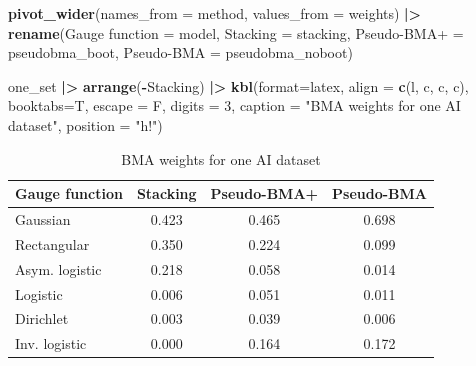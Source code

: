 \documentclass[
]{article}
\newenvironment{Shaded}{\begin{snugshade}}{\end{snugshade}}
\newcommand{\AttributeTok}[1]{\textcolor[rgb]{0.13,0.29,0.53}{#1}}
\newcommand{\DecValTok}[1]{\textcolor[rgb]{0.00,0.00,0.81}{#1}}
\newcommand{\FunctionTok}[1]{\textcolor[rgb]{0.13,0.29,0.53}{\textbf{#1}}}
\newcommand{\NormalTok}[1]{#1}
\newcommand{\OtherTok}[1]{\textcolor[rgb]{0.56,0.35,0.01}{#1}}
\newcommand{\SpecialCharTok}[1]{\textcolor[rgb]{0.81,0.36,0.00}{\textbf{#1}}}
\newcommand{\StringTok}[1]{\textcolor[rgb]{0.31,0.60,0.02}{#1}}
\begin{document}
\begin{Shaded}
\begin{Highlighting}[]
  \FunctionTok{pivot\_wider}\NormalTok{(}\AttributeTok{names\_from =}\NormalTok{ method, }\AttributeTok{values\_from =}\NormalTok{ weights) }\SpecialCharTok{|\textgreater{}}
  \FunctionTok{rename}\NormalTok{(}\StringTok{\textquotesingle{}Gauge function\textquotesingle{}} \OtherTok{=}\NormalTok{ model, }\StringTok{\textquotesingle{}Stacking\textquotesingle{}} \OtherTok{=}\NormalTok{ stacking, }\StringTok{\textquotesingle{}Pseudo{-}BMA+\textquotesingle{}} \OtherTok{=}\NormalTok{ pseudobma\_boot, }\StringTok{\textquotesingle{}Pseudo{-}BMA\textquotesingle{}} \OtherTok{=}\NormalTok{ pseudobma\_noboot)}

\NormalTok{one\_set }\SpecialCharTok{|\textgreater{}} \FunctionTok{arrange}\NormalTok{(}\SpecialCharTok{{-}}\NormalTok{Stacking) }\SpecialCharTok{|\textgreater{}} \FunctionTok{kbl}\NormalTok{(}\AttributeTok{format=}\StringTok{\textquotesingle{}latex\textquotesingle{}}\NormalTok{, }\AttributeTok{align =} \FunctionTok{c}\NormalTok{(}\StringTok{\textquotesingle{}l\textquotesingle{}}\NormalTok{, }\StringTok{\textquotesingle{}c\textquotesingle{}}\NormalTok{, }\StringTok{\textquotesingle{}c\textquotesingle{}}\NormalTok{, }\StringTok{\textquotesingle{}c\textquotesingle{}}\NormalTok{), }\AttributeTok{booktabs=}\NormalTok{T, }\AttributeTok{escape =}\NormalTok{ F, }\AttributeTok{digits =} \DecValTok{3}\NormalTok{, }
      \AttributeTok{caption =} \StringTok{"BMA weights for one AI dataset"}\NormalTok{, }\AttributeTok{position =} \StringTok{"h!"}\NormalTok{)}
\end{Highlighting}
\end{Shaded}

\begin{table}[h!]

\caption{\label{tab:unnamed-chunk-1}BMA weights for one AI dataset}
\centering
\begin{tabular}[t]{lccc}
\toprule
Gauge function & Stacking & Pseudo-BMA+ & Pseudo-BMA\\
\midrule
Gaussian & 0.423 & 0.465 & 0.698\\
Rectangular & 0.350 & 0.224 & 0.099\\
Asym. logistic & 0.218 & 0.058 & 0.014\\
Logistic & 0.006 & 0.051 & 0.011\\
Dirichlet & 0.003 & 0.039 & 0.006\\
\addlinespace
Inv. logistic & 0.000 & 0.164 & 0.172\\
\bottomrule
\end{tabular}
\end{table}
\end{document}
